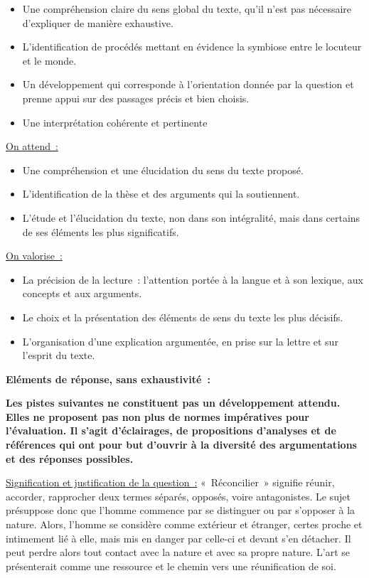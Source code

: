 {\begin{itemize}
\item Une compréhension claire du sens global du texte, qu'il n'est pas nécessaire d'expliquer
de manière exhaustive.
\item  L'identification de procédés mettant en évidence la symbiose entre le locuteur et le monde.
\item  Un développement qui corresponde à l'orientation donnée par la question et prenne appui
sur des passages précis et bien choisis.
\item  Une interprétation cohérente et pertinente
\end{itemize}}%
{\underline{On attend~:}

\begin{itemize}
\item Une compréhension et une élucidation du sens du texte proposé.
\item L'identification de la thèse et des arguments qui la soutiennent.
\item L'étude et l'élucidation du texte, non dans son intégralité, mais dans certains de ses
éléments les plus significatifs.
\end{itemize}

\underline{On valorise~:}

\begin{itemize}
\item La précision de la lecture~: l'attention portée à la langue et à son lexique, aux concepts et
aux arguments.
\item Le choix et la présentation des éléments de sens du texte les plus décisifs.
\item L'organisation d'une explication argumentée, en prise sur la lettre et sur l'esprit du texte.
\end{itemize}

\textbf{Eléments de réponse, sans exhaustivité~:}

\textbf{Les pistes suivantes ne constituent pas un développement attendu. Elles ne proposent pas
non plus de normes impératives pour l'évaluation. Il s'agit d'éclairages, de propositions
d'analyses et de références qui ont pour but d'ouvrir à la diversité des argumentations et des
réponses possibles.}

\underline{Signification et justification de la question~:} «~Réconcilier~» signifie réunir, accorder, rapprocher
deux termes séparés, opposés, voire antagonistes. Le sujet présuppose donc que l'homme
commence par se distinguer ou par s'opposer à la nature. Alors, l'homme se considère comme
extérieur et étranger, certes proche et intimement lié à elle, mais mis en danger par celle-ci et
devant s'en détacher. Il peut perdre alors tout contact avec la nature et avec sa propre nature. L'art
se présenterait comme une ressource et le chemin vers une réunification de soi.

}
